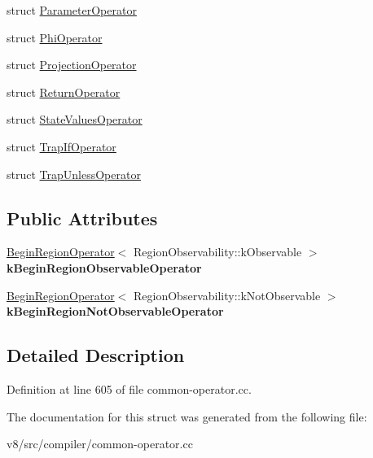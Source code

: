 \begin{DoxyCompactItemize}
struct \mbox{\hyperlink{structv8_1_1internal_1_1compiler_1_1CommonOperatorGlobalCache_1_1ParameterOperator}{Parameter\+Operator}}
\item 
struct \mbox{\hyperlink{structv8_1_1internal_1_1compiler_1_1CommonOperatorGlobalCache_1_1PhiOperator}{Phi\+Operator}}
\item 
struct \mbox{\hyperlink{structv8_1_1internal_1_1compiler_1_1CommonOperatorGlobalCache_1_1ProjectionOperator}{Projection\+Operator}}
\item 
struct \mbox{\hyperlink{structv8_1_1internal_1_1compiler_1_1CommonOperatorGlobalCache_1_1ReturnOperator}{Return\+Operator}}
\item 
struct \mbox{\hyperlink{structv8_1_1internal_1_1compiler_1_1CommonOperatorGlobalCache_1_1StateValuesOperator}{State\+Values\+Operator}}
\item 
struct \mbox{\hyperlink{structv8_1_1internal_1_1compiler_1_1CommonOperatorGlobalCache_1_1TrapIfOperator}{Trap\+If\+Operator}}
\item 
struct \mbox{\hyperlink{structv8_1_1internal_1_1compiler_1_1CommonOperatorGlobalCache_1_1TrapUnlessOperator}{Trap\+Unless\+Operator}}
\end{DoxyCompactItemize}
\subsection*{Public Attributes}
\begin{DoxyCompactItemize}
\item 
\mbox{\label{structv8_1_1internal_1_1compiler_1_1CommonOperatorGlobalCache_a17f955ddb2b5839b3b58122a9f27aa3a}} 
\mbox{\hyperlink{structv8_1_1internal_1_1compiler_1_1CommonOperatorGlobalCache_1_1BeginRegionOperator}{Begin\+Region\+Operator}}$<$ Region\+Observability\+::k\+Observable $>$ {\bfseries k\+Begin\+Region\+Observable\+Operator}
\item 
\mbox{\label{structv8_1_1internal_1_1compiler_1_1CommonOperatorGlobalCache_ae32806e0f4b2d55239fc310a0fd8638e}} 
\mbox{\hyperlink{structv8_1_1internal_1_1compiler_1_1CommonOperatorGlobalCache_1_1BeginRegionOperator}{Begin\+Region\+Operator}}$<$ Region\+Observability\+::k\+Not\+Observable $>$ {\bfseries k\+Begin\+Region\+Not\+Observable\+Operator}
\end{DoxyCompactItemize}


\subsection{Detailed Description}


Definition at line 605 of file common-\/operator.\+cc.



The documentation for this struct was generated from the following file\+:\begin{DoxyCompactItemize}
\item 
v8/src/compiler/common-\/operator.\+cc\end{DoxyCompactItemize}
